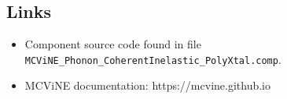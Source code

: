 \subsection*{Links}
\begin{itemize}
  \item Component source code found in file \texttt{MCViNE\_Phonon\_CoherentInelastic\_PolyXtal.comp}.
  \item MCViNE documentation: https://mcvine.github.io
\end{itemize}
